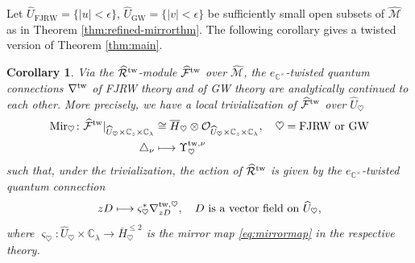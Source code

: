 \documentclass[11pt]{amsart}
\newtheorem{cor}[thm]{Corollary} %
\theoremstyle{definition} %
\theoremstyle{remark} %
\newcommand{\CC}{\mathbb C}
\newcommand{\tw}{{\rm tw}}
\def\GW{\operatorname{\text{GW}}}
\newcommand{\cO}{\mathcal{O}}
\newcommand{\cM}{\mathcal{M}}
\newcommand{\hcM}{\widehat{\cM}}
\newcommand{\cF}{\mathcal{F}}
\newcommand{\hcF}{\widehat{\cF}}
\newcommand{\cR}{\mathcal{R}}
\newcommand{\hcR}{\widehat{\cR}}
\newcommand{\FJRW}{{\operatorname{FJRW}}}
\renewcommand{\GW}{{\operatorname{GW}}}
\newcommand{\Mir}{\operatorname{Mir}}
\newcommand{\hU}{\widehat{U}}
\newcommand{\ov}{\overline}
\begin{document}
Let $\hU_{\FJRW}= \{|u| < \epsilon \}$, 
$\hU_{\GW}=\{|v|< \epsilon \}$ be sufficiently small 
open subsets of $\hcM$ 
as in Theorem \ref{thm:refined-mirrorthm}. 
The following corollary gives a twisted version 
of Theorem \ref{thm:main}. 


\begin{cor} 
\label{cor:anconti-twisted} 
Via the $\hcR^\tw$-module $\hcF^\tw$ over $\hcM$, 
the $e_{\CC^\times}$-twisted quantum connections $\nabla^\tw$ 
of FJRW theory and of GW theory 
are analytically continued to each other. 
More precisely, we have a local trivialization of $\hcF^\tw$ 
over $\hU_\heartsuit$ 
\begin{align*} 
\Mir_\heartsuit \colon 
\hcF^\tw|_{\hU_{\heartsuit} \times \CC_z\times \CC_\lambda} 
& \cong \ov{H}_\heartsuit 
\otimes \cO_{\hU_{\heartsuit} \times \CC_z\times \CC_\lambda}, 
\quad 
\heartsuit = \FJRW \text{ or } \GW \\ 
\triangle_\nu & \longmapsto \Upsilon^{\tw,\nu}_\heartsuit  
\end{align*}  
such that, under the trivialization, 
the action of $\hcR^{\tw}$ is 
given by the $e_{\CC^\times}$-twisted quantum connection 
\[
z D \longmapsto \varsigma_\heartsuit^* \nabla^{\tw,\heartsuit}_{zD}, \quad 
\text{$D$ is a vector field on $\hU_{\heartsuit}$,}
\]
where $\varsigma_\heartsuit \colon \hU_\heartsuit\times \CC_\lambda
\to \ov{H}^{\le 2}_\heartsuit$ 
is the mirror map \eqref{eq:mirrormap} in the respective theory. 
\end{cor} 
\end{document}
